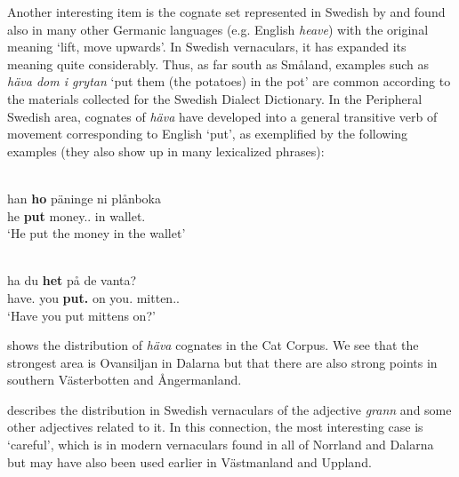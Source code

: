 Another interesting item is the cognate set represented in Swedish by  and found also in many other Germanic languages (e.g. English \textit{heave}) with the original meaning ‘lift, move upwards’. In Swedish vernaculars, it has expanded its meaning quite considerably. Thus, as far south as Småland, examples such as \textit{häva dom i grytan} ‘put them (the potatoes) in the pot’ are common according to the materials collected for the Swedish Dialect Dictionary. In the Peripheral Swedish area, cognates\textit{ }of \textit{häva} have developed into a general transitive verb of movement corresponding to English ‘put’, as exemplified by the following examples (they also show up in many lexicalized phrases):

\ea\label{}
\\
\gll han  \textbf{ho} päninge  ni  plånboka\\
he  \textbf{put{\pst}} money.{\pl}.{}  in  wallet.{}\\
\glt ‘He put the money in the wallet’
\z

\ea\label{}
\\
\gll ha  du  \textbf{het} på  de  vanta?\\
have.{\prs}  you  \textbf{put.{\supp}} on  you.{\obl}  mitten.{}.{\pl}\\
\glt ‘Have you put mittens on?’
\z

shows the distribution of \textit{häva} cognates in the Cat Corpus. We see that the strongest area is Ovansiljan in Dalarna but that there are also strong points in southern Västerbotten and Ångermanland. 

\citet{Eaker1993} describes the distribution in Swedish vernaculars of the adjective \textit{grann} and some other adjectives related to it. In this connection, the most interesting case is  ‘careful’, which is in modern vernaculars found in all of Norrland and Dalarna but may have also been used earlier in Västmanland and Uppland. 

 

